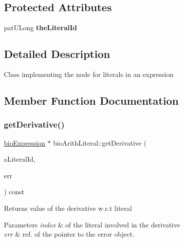 \subsection*{Protected Attributes}
\begin{DoxyCompactItemize}
\item 
\mbox{\label{classbio_arith_literal_a09eb7ed85621c6f987d2a23644839828}} 
pat\+U\+Long {\bfseries the\+Literal\+Id}
\end{DoxyCompactItemize}


\subsection{Detailed Description}
Class implementing the node for literals in an expression 

\subsection{Member Function Documentation}
\mbox{\label{classbio_arith_literal_affebfbf01e421ec9cf55b4cf883039ce}} 
\subsubsection{\texorpdfstring{get\+Derivative()}{getDerivative()}}
{\footnotesize\ttfamily \hyperlink{classbio_expression}{bio\+Expression} $\ast$ bio\+Arith\+Literal\+::get\+Derivative (\begin{DoxyParamCaption}\item[{pat\+U\+Long}]{a\+Literal\+Id,  }\item[{pat\+Error $\ast$\&}]{err }\end{DoxyParamCaption}) const\hspace{0.3cm}{\ttfamily [virtual]}}

\begin{DoxyReturn}{Returns}
value of the derivative w.\+r.\+t literal 
\end{DoxyReturn}

\begin{DoxyParams}{Parameters}
{\em index} & of the literal involved in the derivative \\
\hline
{\em err} & ref. of the pointer to the error object. \\
\hline
\end{DoxyParams}


